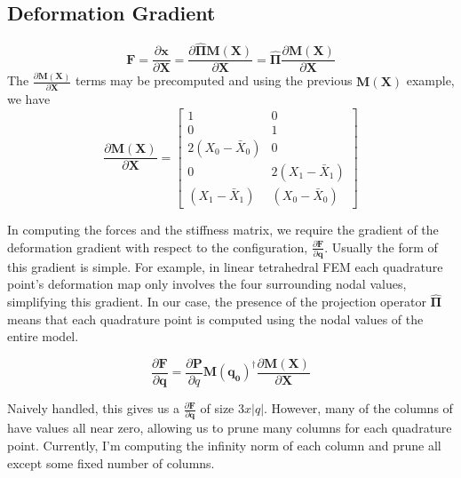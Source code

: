 \subsection{Deformation Gradient}
\begin{equation}
        \mathbf{F} = \frac{\partial \mathbf{x}}{\partial \mathbf{X}}
               = \frac{\partial \hat{\mathbf{\Pi}}\mathbf{M(X)}}{\partial \mathbf{X}}
               = \hat{\mathbf{\Pi}} \frac{\partial \mathbf{M(X)}}{\partial \mathbf{X}} 
\end{equation}
The $\frac{\partial \mathbf{M(X)}}{\partial \mathbf{X}}$ terms may be precomputed and using the previous $\mathbf{M(X)}$ example, we have
\begin{equation}
     \frac{\partial \mathbf{M(X)}}{\partial \mathbf{X}} = \begin{bmatrix}
     1&0 \\ 
     0&1 \\ 
     2(X_0 - \bar{X}_0)&0 \\ 
     0&2(X_1 - \bar{X}_1) \\ 
     (X_1 - \bar{X}_1)&(X_0 - \bar{X}_0) 
    \end{bmatrix}
\end{equation}

In computing the forces and the stiffness matrix, we require the gradient of the deformation gradient with respect to the configuration,  $\frac{\partial \mathbf{F}}{\partial \mathbf{q}}$. Usually the form of this gradient is simple. For example, in linear tetrahedral FEM each quadrature point's deformation map only involves the four surrounding nodal values, simplifying this gradient. In our case, the presence of the projection operator $\hat{\mathbf{\Pi}}$ means that each quadrature point is computed using the nodal values of the entire model. 

\begin{equation}
    \frac{\partial \mathbf{F}}{\partial \mathbf{q}} = \frac{\partial \mathbf{P}}{\partial q}\mathbf{M(q_0)}^\dagger  \frac{\partial \mathbf{M(X)}}{\partial \mathbf{X}} 
\end{equation}


Naively handled, this gives us a $\frac{\partial \mathbf{F}}{\partial \mathbf{q}}$ of size $3 x |q|$. However, many of the columns of have values all near zero, allowing us to prune many columns for each quadrature point. Currently, I'm computing the infinity norm of each column and prune all except some fixed number of columns. \\


